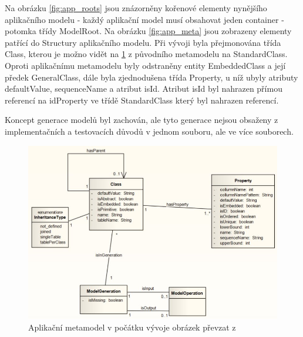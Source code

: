 \documentclass[11pt,twoside,a4paper]{book}
\begin{document}
Na obrázku \ref{fig:app_roots} jsou znázorněny kořenové elementy
nynějšího aplikačního modelu - každý aplikační model musí obsahovat jeden
container - potomka třídy ModelRoot. Na obrázku \ref{fig:app_meta} jsou
zobrazeny elementy patřící do Structury aplikačního modelu. Při vývoji byla
přejmonována třída Class, kterou je možno vidět na \ref{fig:lukes:app_meta} z
původního metamodelu na StandardClass.
Oproti aplikačnímu metamodelu \cite{Jezek} byly odstraněny entity EmbeddedClass 
a její předek GeneralClass, dále byla zjednodušena třída Property, u níž ubyly
atributy defaultValue, sequenceName a atribut isId. Atribut isId byl nahrazen
přímou referencí na idProperty ve třídě StandardClass který byl nahrazen 
referencí.

Koncept generace modelů byl zachován, ale tyto generace nejsou obsaženy z
implementačních a testovacích důvodů v jednom souboru, ale ve více souborech.

\begin{figure}[ht]
\begin{center}
\includegraphics[width=15cm]{figures/app_meta_BP}
\caption{Aplikační metamodel v počátku vývoje obrázek převzat z \cite{Lukes}}
\label{fig:lukes:app_meta}
\end{center}
\end{figure}
\end{document}
